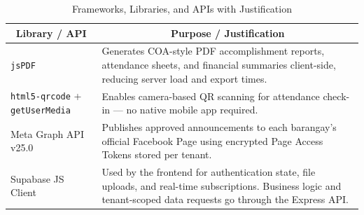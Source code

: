 \begin{table}[H]
\centering
\caption{Frameworks, Libraries, and APIs with Justification}
\label{tab:frameworks_libraries_apis_justification}
\begin{tabular}{|l|p{8.5cm}|}
\hline
\multicolumn{1}{|c|}{\textbf{Library / API}} & \multicolumn{1}{c|}{\textbf{Purpose / Justification}} \\ \hline
\texttt{jsPDF} & Generates COA-style PDF accomplishment reports, attendance sheets, and financial summaries client-side, reducing server load and export times. \\ \hline
\texttt{html5-qrcode} + \texttt{getUserMedia} & Enables camera-based QR scanning for attendance check-in --- no native mobile app required. \\ \hline
Meta Graph API v25.0 & Publishes approved announcements to each barangay's official Facebook Page using encrypted Page Access Tokens stored per tenant. \\ \hline
Supabase JS Client & Used by the frontend for authentication state, file uploads, and real-time subscriptions. Business logic and tenant-scoped data requests go through the Express API. \\ \hline
\end{tabular}
\end{table}
\vspace{5mm}